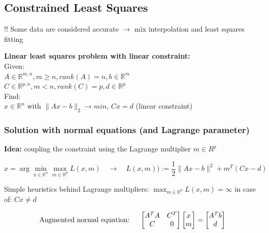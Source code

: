 \documentclass[12pt, a4paper]{article}
\newcommand{\R}{\mathbb{R}}
\newcommand{\argmin}{\arg\!\min}
\begin{document}
\subsection{Constrained Least Squares}

!! Some data are considered accurate $\rightarrow$ mix interpolation and least squares fitting

\begin{tcolorbox}
\textbf{Linear least squares problem with linear constraint:}
\vspace{2mm} \\
Given: \\
$A \in \R^{m,n}, m \geq n, rank(A) = n, b \in \R^{m}$\\
 $C \in \R^{p,n}, m < n, rank(C) = p, d \in \R^{p}$ \\

Find: \\
$x \in \R^{n}$ with $ \lVert Ax - b\rVert_{2} \rightarrow min $, \quad \quad $Cx =d$ (linear constraint)	
\end{tcolorbox}

\subsubsection{Solution with normal equations (and Lagrange parameter)}

\textbf{Idea:} coupling the constraint using the Lagrange multiplier $m \in R^{p}$

\begin{equation*}
	x = \argmin_{x \in \R^{n}}  \max_{m \in \R^{p}} L(x,m)  \quad \longrightarrow \quad L(x,m) ) := \frac{1}{2} \lVert Ax - b\rVert^{2} + m^{T} (Cx - d)
\end{equation*}

Simple heuristics behind Lagrange multipliers: $\max_{m \in \R^{p}} L(x,m) = \infty $ in case of: $Cx \not = d$

\begin{equation*}
	\text{Augmented normal equation: \quad}
  	\begin{bmatrix}
  		A^{T}A 	& C^{T} \\
  		C 			& 0 
  	\end{bmatrix}
  	\begin{bmatrix}
  		x \\
  		m
  	\end{bmatrix} 
  	=
  	\begin{bmatrix}
  		A^{T}b \\
  		d
  	\end{bmatrix} 
\end{equation*}
\end{document}
